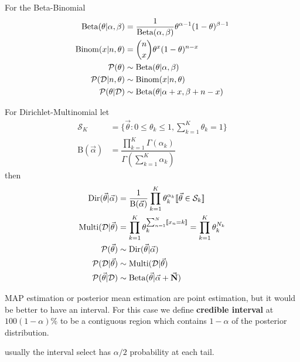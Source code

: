 \documentclass[../main.tex]{subfiles}
\begin{document}
For the Beta-Binomial
\begin{align*}
    \mathrm{Beta}(\theta|\alpha,\beta)&= \dfrac{1}{\mathrm{Beta}(\alpha,\beta)}\theta^{\alpha-1}(1-\theta)^{\beta-1}\\
    \mathrm{Binom}(x|n,\theta)&= \binom{n}{x}\theta^x(1-\theta)^{n-x}\\
    \mathcal{P}(\theta) &\sim \mathrm{Beta}(\theta|\alpha,\beta)\\
    \mathcal{P}(\mathcal{D}|n,\theta) &\sim \mathrm{Binom}(x|n,\theta)\\
    \mathcal{P}(\theta|\mathcal{D}) &\sim \mathrm{Beta}(\theta|\alpha+x,\beta+n-x)
\end{align*}

For Dirichlet-Multinomial let
\begin{align*}
    \mathcal{S}_K&= \{ \vec{\theta} : 0\le\theta_k\le1, \sum_{k=1}^K \theta_k = 1 \}\\
    \mathrm{B}(\vec{\alpha})&= \dfrac{\prod_{k=1}^K\Gamma(\alpha_k)}{\Gamma(\sum_{k=1}^K \alpha_k)}
\end{align*}
then
\begin{align*}
    \mathrm{Dir}(\vec{\theta}|\vec{\alpha})&= \dfrac{1}{\mathrm{B}(\vec{\alpha})}\prod_{k=1}^K \theta_k^{\alpha_k} \indicator{\vec{\theta}\in\mathcal{S}_k}\\
    \mathrm{Multi}(\D|\vec{\theta})&= \prod_{k=1}^K \theta_k^{\sum_{n=1}^N \indicator{x_n=k}}=\prod_{k=1}^K \theta_k^{N_k}\\
    \p(\vec{\theta}) &\sim \mathrm{Dir}(\vec{\theta}|\vec{\alpha})\\
    \p(\D|\vec{\theta}) &\sim \mathrm{Multi}(\D|\vec{\theta})\\
    \p(\vec{\theta}|\D) &\sim \mathrm{Beta}(\vec{\theta}|\vec{\alpha}+\vec{N})
\end{align*}

MAP estimation or posterior mean estimation are point estimation, but it would be better to have an interval. For this case we define \textbf{credible interval} at $100(1-\alpha)\%$ to be a contiguous region which contains $1-\alpha$ of the posterior distribution.
\begin{figure}[H]
    \centering
\end{figure}
usually the interval select has $\alpha/2$ probability at each tail.
\end{document}
